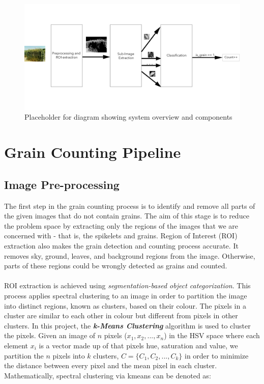 \smallskip

\begin{figure}[ht!]
\centering
\includegraphics[scale=.4]{Images/design_pipeline}
\caption{Placeholder for diagram showing system overview and components}
\label{fig1}
\end{figure}

\smallskip

\goodbreak
\section{Grain Counting Pipeline}
\subsection{Image Pre-processing}
The first step in the grain counting process is to identify and remove all parts of the given images that do not contain grains. The aim of this stage is to reduce the problem space by extracting only the regions of the images that we are concerned with - that is, the spikelets and grains. Region of Interest (ROI) extraction also makes the grain detection and counting process accurate. It removes sky, ground, leaves, and background regions from the image. Otherwise, parts of these regions could be wrongly detected as grains and counted.\\ \\
%
ROI extraction is achieved using \textit{segmentation-based object categorization}. This process applies spectral clustering to an image in order to partition the image into distinct regions, known as clusters, based on their colour. The pixels in a cluster are similar to each other in colour but different from pixels in other clusters. In this project, the \textit{\textbf{k-Means Clustering}}\cite{REF25} algorithm is used to cluster the pixels. Given an image of $n$ pixels ($x_1, x_2, ..., x_n$) in the HSV space \cite{REF26} where each element $x_i$ is a vector made up of that pixels hue, saturation and value, we partition the $n$ pixels into $k$ clusters, $C = \{C_1, C_2, ..., C_k\}$ in order to minimize the distance between every pixel and the mean pixel in each cluster. Mathematically, spectral clustering via kmeans can be denoted as:

